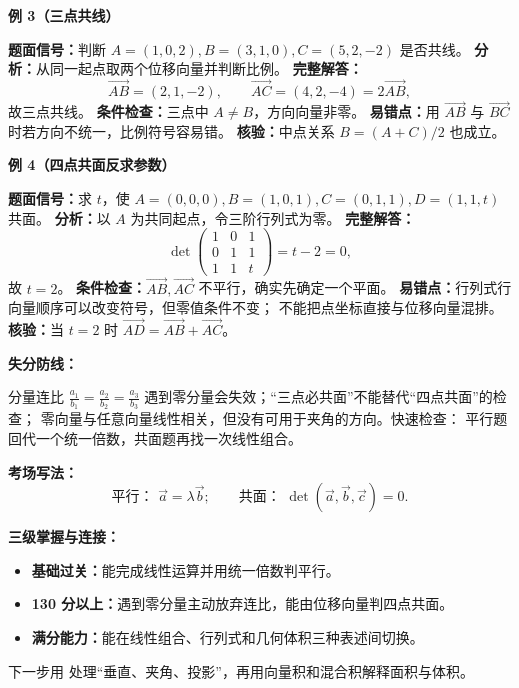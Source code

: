 \begin{knowledgeBox}
\textbf{例 3（三点共线）}

\textbf{题面信号：}判断 \(A=(1,0,2),B=(3,1,0),C=(5,2,-2)\)
是否共线。
\textbf{分析：}从同一起点取两个位移向量并判断比例。
\textbf{完整解答：}
\[
\overrightarrow{AB}=(2,1,-2),\qquad
\overrightarrow{AC}=(4,2,-4)=2\overrightarrow{AB},
\]
故三点共线。
\textbf{条件检查：}三点中 \(A\ne B\)，方向向量非零。
\textbf{易错点：}用 \(\overrightarrow{AB}\) 与
\(\overrightarrow{BC}\) 时若方向不统一，比例符号容易错。
\textbf{核验：}中点关系 \(B=(A+C)/2\) 也成立。

\textbf{例 4（四点共面反求参数）}

\textbf{题面信号：}求 \(t\)，使
\(A=(0,0,0),B=(1,0,1),C=(0,1,1),D=(1,1,t)\) 共面。
\textbf{分析：}以 \(A\) 为共同起点，令三阶行列式为零。
\textbf{完整解答：}
\[
\det\begin{pmatrix}
1&0&1\\
0&1&1\\
1&1&t
\end{pmatrix}
=t-2=0,
\]
故 \(t=2\)。
\textbf{条件检查：}\(\overrightarrow{AB},\overrightarrow{AC}\)
不平行，确实先确定一个平面。
\textbf{易错点：}行列式行向量顺序可以改变符号，但零值条件不变；
不能把点坐标直接与位移向量混排。
\textbf{核验：}当 \(t=2\) 时
\(\overrightarrow{AD}=\overrightarrow{AB}+\overrightarrow{AC}\)。

\textbf{失分防线：}

分量连比 \(\frac{a_1}{b_1}=\frac{a_2}{b_2}=\frac{a_3}{b_3}\)
遇到零分量会失效；“三点必共面”不能替代“四点共面”的检查；
零向量与任意向量线性相关，但没有可用于夹角的方向。快速检查：
平行题回代一个统一倍数，共面题再找一次线性组合。

\textbf{考场写法：}
\[
\boxed{\text{平行： }\vec a=\lambda\vec b;\qquad
\text{共面： }\det(\vec a,\vec b,\vec c)=0.}
\]

\textbf{三级掌握与连接：}
\begin{itemize}
  \item \textbf{基础过关：}能完成线性运算并用统一倍数判平行。
  \item \textbf{130 分以上：}遇到零分量主动放弃连比，能由位移向量判四点共面。
  \item \textbf{满分能力：}能在线性组合、行列式和几何体积三种表述间切换。
\end{itemize}
下一步用 
处理“垂直、夹角、投影”，再用向量积和混合积解释面积与体积。
\end{knowledgeBox}



